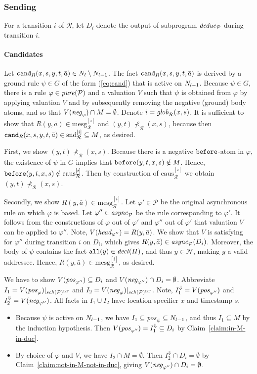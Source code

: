 \documentclass{tlp}
\newcommand{\ded}{\mathcal{P}}
\newcommand{\proj}[2]{#1|_{#2}}
\newcommand{\rl}{\varphi}
\newcommand{\head}[1]{\fname{head}_{#1}}
\newcommand{\bpos}[1]{\fname{pos}_{#1}}
\newcommand{\bneg}[1]{\fname{neg}_{#1}}
\newcommand{\schof}[1]{\fname{sch}(#1)}
\newcommand{\grl}{\psi}
\newcommand{\nw}{\mathcal{N}}
\newcommand{\toloct}[1]{#1^{\mathrm{LT}}}
\newcommand{\droplt}[1]{#1^{\Downarrow}}
\newcommand{\relall}{\pred{all}}
\newcommand{\before}{\pred{before}}
\newcommand{\cand}{\pred{cand}}
\newcommand{\decl}[1]{\fname{decl}(#1)}
\newcommand{\pure}[1]{\fname{pure}(#1)}
\newcommand{\run}{\mathcal{R}}
\newcommand{\deduc}[1]{\fname{deduc}_{#1}}
\newcommand{\async}[1]{\fname{async}_{#1}}
\newcommand{\mstep}[1]{(#1)}
\newcommand{\globR}[1]{\fname{glob}_{\run}(#1)}
\newcommand{\slicesnd}[1]{\text{snd}_{\run}^{[#1]}}
\newcommand{\slicecaus}[1]{\text{caus}_{\run}^{[#1]}}
\newcommand{\mesg}[1]{\mathrm{mesg}_{\run}^{[#1]}}
\newcommand{\caus}{\prec_{\run}}
\newcommand{\grded}{G}
\begin{document}
\begin{appendix}
\subsubsection{Sending}

For a transition $i$ of $\run$, let $D_{i}$ denote the output of
subprogram $\deduc{\ded}$ during transition $i$.


\paragraph*{Candidates}

Let $\cand_{R}(x,s,y,t,\bar{a})\in\diffN$. The fact $\cand_{R}(x,s,y,t,\bar{a})$
is derived by a ground rule $\grl\in\grded$ of the form (\ref{eq:cand})
that is active on $N_{l-1}$. Because $\grl\in\grded$, there is a
rule $\rl\in\pure{\ded}$ and a valuation $V$ such that $\grl$ is
obtained from $\rl$ by applying valuation $V$ and by subsequently
removing the negative (ground) body atoms, and so that $V(\bneg{\rl})\cap M=\emptyset$.
Denote $i=\globR{x,s}$. It is sufficient to show that $R(y,\bar{a})\in\mesg i$
and $(y,t)\not\caus(x,s)$, because then $\cand_{R}(x,s,y,t,\bar{a})\in\slicesnd i\subseteq M$,
as desired. 

First, we show $(y,t)\not\caus(x,s)$. Because there is a negative
$\before$-atom in $\rl$, the existence of $\grl$ in $\grded$ implies
that $\before(y,t,x,s)\notin M$. Hence, $\before(y,t,x,s)\notin\slicecaus i$.
Then by construction of $\slicecaus i$ we obtain $(y,t)\not\caus(x,s)$.

Secondly, we show $R(y,\bar{a})\in\mesg i$. Let $\rl'\in\ded$ be
the original asynchronous rule on which $\rl$ is based. Let $\rl''\in\async{\ded}$
be the rule corresponding to $\rl'$. It follows from the constructions
of $\rl$ out of $\rl'$ and $\rl''$ out of $\rl'$ that valuation
$V$ can be applied to $\rl''$. Note, $V(\head{\rl''})=R(y,\bar{a})$.
We show that $V$ is satisfying for $\rl''$ during transition $i$
on $D_{i}$, which gives $R(y,\bar{a})\in\async{\ded}\mstep{D_{i}}$.
Moreover, the body of $\grl$ contains the fact $\relall(y)\in\decl H$,
and thus $y\in\nw$, making $y$ a valid addressee. Hence, $R(y,\bar{a})\in\mesg i$,
as desired.

We have to show $V(\bpos{\rl''})\subseteq D_{i}$ and $V(\bneg{\rl''})\cap D_{i}=\emptyset$.
Abbreviate $I_{1}=\proj{V(\bpos{\rl})}{\toloct{\schof{\ded}}}$ and
$I_{2}=\proj{V(\bneg{\rl})}{\toloct{\schof{\ded}}}$. Note, $\droplt{I_{1}}=V(\bpos{\rl''})$
and $\droplt{I_{2}}=V(\bneg{\rl''})$. All facts in $I_{1}\cup I_{2}$
have location specifier $x$ and timestamp $s$.
\begin{itemize}
\item Because $\grl$ is active on $N_{l-1}$, we have $I_{1}\subseteq\bpos{\grl}\subseteq\prevN$,
and thus $I_{1}\subseteq M$ by the induction hypothesis. Then $V(\bpos{\rl''})=\droplt{I_{1}}\subseteq D_{i}$
by Claim~\ref{claim:in-M-in-duc}.
\item By choice of $\rl$ and $V$, we have $I_{2}\cap M=\emptyset$. Then
$\droplt{I_{2}}\cap D_{i}=\emptyset$ by Claim~\ref{claim:not-in-M-not-in-duc},
giving $V(\bneg{\rl''})\cap D_{i}=\emptyset$.
\end{itemize}




\end{appendix}
\end{document}
